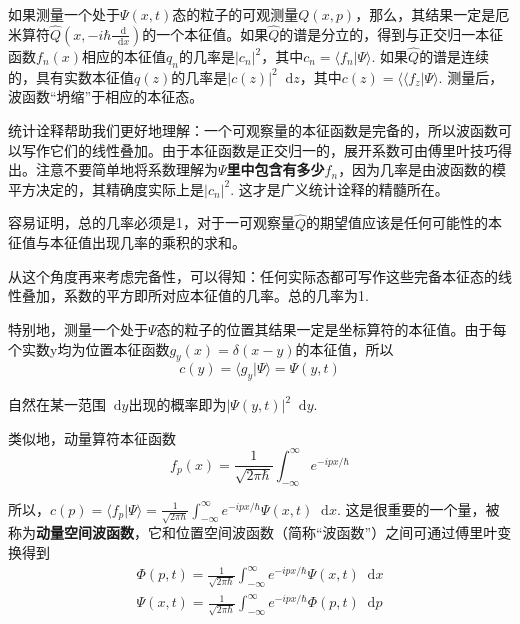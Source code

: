 \documentclass[UTF8]{ctexart}
\begin{document}
    如果测量一个处于$\Psi(x,t)$态的粒子的可观测量$Q(x,p)$，那么，其结果一定是厄米算符$\hat{Q}(x,-i \hbar \frac{\mathop{}\!\mathrm{d} }{\mathop{}\!\mathrm{d} x})$的一个本征值。如果$\hat{Q}$的谱是分立的，得到与正交归一本征函数$f_n(x)$相应的本征值$q_n$的几率是$|c_n|^2$，其中$c_n = \langle f_n | \Psi \rangle$. 如果$\hat{Q}$的谱是连续的，具有实数本征值$q(z)$的几率是$|c(z)|^2 \mathop{}\!\mathrm{d} z$，其中$c(z) = \langle \langle f_z | \Psi \rangle$. 测量后，波函数“坍缩”于相应的本征态。

    统计诠释帮助我们更好地理解：一个可观察量的本征函数是完备的，所以波函数可以写作它们的线性叠加。由于本征函数是正交归一的，展开系数可由傅里叶技巧得出。注意不要简单地将系数理解为\textbf{$\Psi$里中包含有多少$f_n$}，因为几率是由波函数的模平方决定的，其精确度实际上是$|c_n|^2$. 这才是广义统计诠释的精髓所在。

    容易证明，总的几率必须是1，对于一可观察量$\hat{Q}$的期望值应该是任何可能性的本征值与本征值出现几率的乘积的求和。

    从这个角度再来考虑完备性，可以得知：任何实际态都可写作这些完备本征态的线性叠加，系数的平方即所对应本征值的几率。总的几率为1.

    特别地，测量一个处于$\Psi$态的粒子的位置其结果一定是坐标算符的本征值。由于每个实数y均为位置本征函数$g_y(x) = \delta(x-y)$的本征值，所以
    \begin{equation}
        c(y) = \langle g_y | \Psi \rangle = \Psi(y,t)
    \end{equation}

\noindent 自然在某一范围$\mathop{}\!\mathrm{d} y$出现的概率即为$|\Psi(y,t)|^2 \mathop{}\!\mathrm{d} y$.

    类似地，动量算符本征函数
    \begin{equation}
        f_p(x) = \frac{1}{\sqrt{2 \pi \hbar}}\int_{-\infty}^{\infty}e^{-ipx/\hbar}
    \end{equation}

\noindent 所以，$c(p) = \langle f_p | \Psi \rangle = \frac{1}{\sqrt{2 \pi \hbar}}\int_{-\infty}^{\infty}e^{-ipx/\hbar} \Psi(x,t) \mathop{}\!\mathrm{d} x$. 这是很重要的一个量，被称为\textbf{动量空间波函数}，它和位置空间波函数（简称“波函数”）之间可通过傅里叶变换得到
\begin{equation}
\begin{array}{l}{\Phi(p, t)=\frac{1}{\sqrt{2 \pi \hbar}} \int_{-\infty}^{\infty} e^{-i p x / \hbar} \Psi(x, t) \mathop{}\!\mathrm{d}  x} \\ {\Psi(x, t)=\frac{1}{\sqrt{2 \pi \hbar}} \int_{-\infty}^{\infty} e^{-i p x / \hbar} \Phi(p, t) \mathop{}\!\mathrm{d}  p}\end{array}
\end{equation}
\end{document}
